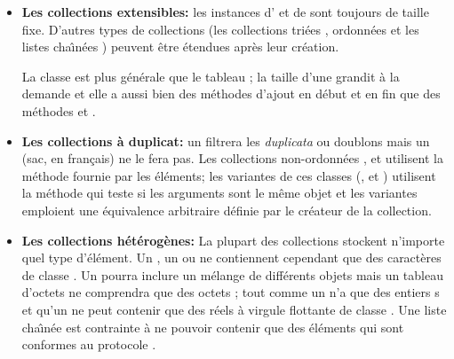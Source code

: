 \documentclass[a4paper,10pt,twoside]{book}
\begin{document}
\begin{itemize}
  \item {\bf Les collections extensibles:}
	les instances d' et de  sont
toujours de taille fixe. D'autres types de collections (les collections tri\'ees , ordonn\'ees  et les listes cha\^{\i}n\'ees ) peuvent \^etre \'etendues apr\`es leur cr\'eation.
	
	La classe  est plus g\'en\'erale que le tableau \mbox{;} la taille d'une  grandit \`a la demande et
elle a aussi bien des m\'ethodes d'ajout en d\'ebut  et en fin  que des m\'ethodes
 et .
  
  \item {\bf Les collections \`a duplicat:}
  	un  filtrera les \emph{duplicata} ou doublons mais un  (sac, en fran\c{c}ais) ne le fera pas.
	Les collections non-ordonn\'ees ,  et  utilisent la m\'ethode
\ct{=} fournie par les \'el\'ements; les variantes  de ces
classes (,  et )
utilisent la m\'ethode \ct{==} qui teste si les arguments sont 
le m\^eme objet et les variantes  emploient une \'equivalence
arbitraire d\'efinie par le cr\'eateur de la collection.

  \item {\bf Les collections h\'et\'erog\`enes:}
	La plupart des collections stockent n'importe quel type d'\'el\'ement.
	Un , un  ou  ne contiennent cependant que des caract\`eres de classe .
	Un  pourra inclure un m\'elange de diff\'erents objets
 mais un tableau d'octets  ne comprendra que des 
octets ; tout comme un  n'a que des entiers s et qu'un  ne peut contenir que des r\'eels \`a virgule flottante de classe .
	Une liste cha\^{\i}n\'ee  est contrainte \`a ne 
pouvoir contenir que des \'el\'ements qui sont conformes au protocole
.

\end{itemize}

\end{document}
